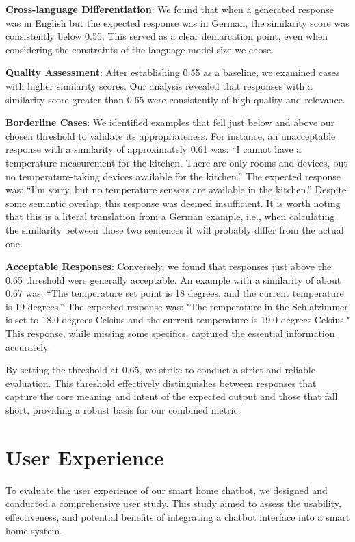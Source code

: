 \textbf{Cross-language Differentiation}: We found that when a generated response was in English but the expected response was in German, the similarity score was consistently below 0.55. This served as a clear demarcation point, even when considering the constraints of the language model size we chose.

\textbf{Quality Assessment}: After establishing 0.55 as a baseline, we examined cases with higher similarity scores. Our analysis revealed that responses with a similarity score greater than 0.65 were consistently of high quality and relevance.

\textbf{Borderline Cases}: We identified examples that fell just below and above our chosen threshold to validate its appropriateness. For instance, an unacceptable response with a similarity of approximately 0.61 was: ``I cannot have a temperature measurement for the kitchen. There are only rooms and devices, but no temperature-taking devices available for the kitchen.'' The expected response was: ``I'm sorry, but no temperature sensors are available in the kitchen.'' Despite some semantic overlap, this response was deemed insufficient.
It is worth noting that this is a literal translation from a German example, i.e., when calculating the similarity between those two sentences it will probably differ from the actual one.

\textbf{Acceptable Responses}: Conversely, we found that responses just above the 0.65 threshold were generally acceptable. An example with a similarity of about 0.67 was: ``The temperature set point is 18 degrees, and the current temperature is 19 degrees.'' The expected response was: "The temperature in the Schlafzimmer is set to 18.0 degrees Celsius and the current temperature is 19.0 degrees Celsius." This response, while missing some specifics, captured the essential information accurately.

By setting the threshold at 0.65, we strike to conduct a strict and reliable evaluation. This threshold effectively distinguishes between responses that capture the core meaning and intent of the expected output and those that fall short, providing a robust basis for our combined metric.



\section{User Experience}

To evaluate the user experience of our smart home chatbot, we designed and conducted a comprehensive user study. This study aimed to assess the usability, effectiveness, and potential benefits of integrating a chatbot interface into a smart home system.

